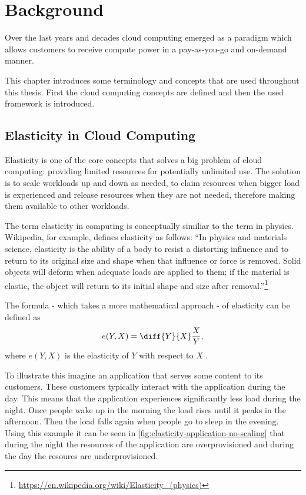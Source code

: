 \chapter{Background}
\label{ch:background}

Over the last years and decades cloud computing emerged as a paradigm which allows customers to receive compute power in a pay-as-you-go and on-demand manner.

This chapter introduces some terminology and concepts that are used throughout this thesis. First the cloud computing concepts are defined and then the used framework is introduced.

\section{Elasticity in Cloud Computing}
\label{sec:elasticity}

Elasticity is one of the core concepts that solves a big problem of cloud computing: providing limited resources for potentially unlimited use. The solution is to scale workloads up and down as needed, to claim resources when bigger load is experienced and release resources when they are not needed, therefore making them available to other workloads.

The term elasticity in computing is conceptually similiar to the term in physics. Wikipedia, for example, defines elasticity as follows: ``In physics and materials science, elasticity is the ability of a body to resist a distorting influence and to return to its original size and shape when that influence or force is removed. Solid objects will deform when adequate loads are applied to them; if the material is elastic, the object will return to its initial shape and size after removal.''\footnote{\url{https://en.wikipedia.org/wiki/Elasticity_(physics)}}

The formula - which takes a more mathematical approach - of elasticity can be defined as \[ e(Y, X) = \diff{Y}{X} \frac{X}{Y}, \] where \(e(Y, X)\) is the elasticity of \(Y\) with respect to \(X\) \cite{dustdarPrinciplesElasticProcesses2011}.

To illustrate this imagine an application that serves some content to its customers. These customers typically interact with the application during the day. This means that the application experiences significantly less load during the night. Once people wake up in the morning the load rises until it peaks in the afternoon. Then the load falls again when people go to sleep in the evening. Using this example it can be seen in \cref{fig:elasticity-application-no-scaling} that during the night the resources of the application are overprovisioned and during the day the resoures are underprovisioned.

